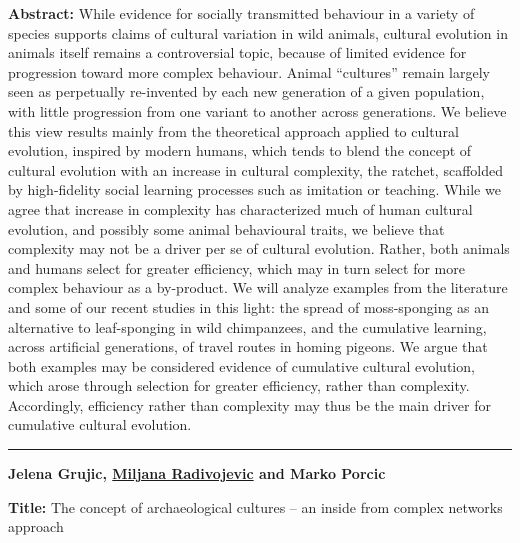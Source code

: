 \documentclass[]{article}
\begin{document}
\textbf{Abstract:} While evidence for socially transmitted behaviour in
a variety of species supports claims of cultural variation in wild
animals, cultural evolution in animals itself remains a controversial
topic, because of limited evidence for progression toward more complex
behaviour. Animal ``cultures'' remain largely seen as perpetually
re-invented by each new generation of a given population, with little
progression from one variant to another across generations. We believe
this view results mainly from the theoretical approach applied to
cultural evolution, inspired by modern humans, which tends to blend the
concept of cultural evolution with an increase in cultural complexity,
the ratchet, scaffolded by high-fidelity social learning processes such
as imitation or teaching. While we agree that increase in complexity has
characterized much of human cultural evolution, and possibly some animal
behavioural traits, we believe that complexity may not be a driver per
se of cultural evolution. Rather, both animals and humans select for
greater efficiency, which may in turn select for more complex behaviour
as a by-product. We will analyze examples from the literature and some
of our recent studies in this light: the spread of moss-sponging as an
alternative to leaf-sponging in wild chimpanzees, and the cumulative
learning, across artificial generations, of travel routes in homing
pigeons. We argue that both examples may be considered evidence of
cumulative cultural evolution, which arose through selection for greater
efficiency, rather than complexity. Accordingly, efficiency rather than
complexity may thus be the main driver for cumulative cultural
evolution.

\rule{4cm}{.4pt}


{\bf {Jelena Grujic, \href{http://www.mcdonald.cam.ac.uk/}{Miljana
Radivojevic} and Marko Porcic}}

\textbf{Title:} The concept of archaeological cultures -- an inside from
complex networks approach
\end{document}
